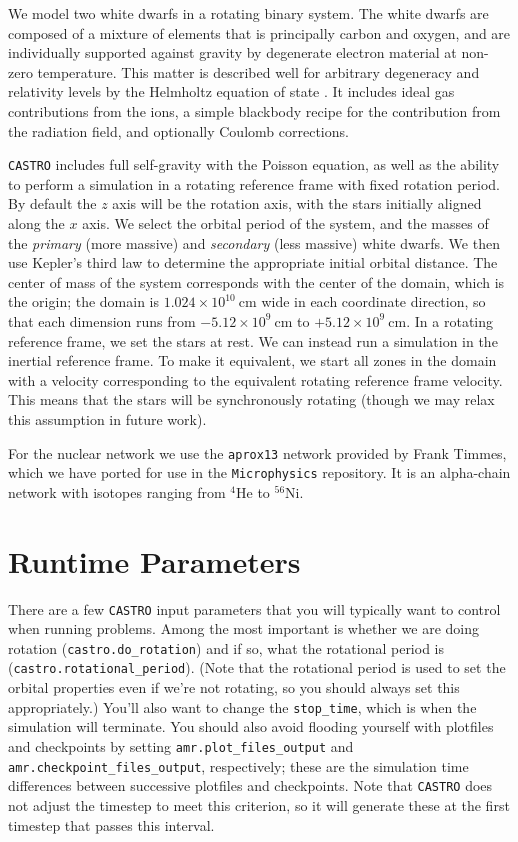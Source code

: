 \documentclass[12pt]{book}
\begin{document}
We model two white dwarfs in a rotating binary system. The white dwarfs are composed of 
a mixture of elements that is principally carbon and oxygen, and are individually supported 
against gravity by degenerate electron material at non-zero temperature. This matter is described well 
for arbitrary degeneracy and relativity levels by the Helmholtz equation of state \cite{timmes_swesty:2000}.
It includes ideal gas contributions from the ions, a simple blackbody recipe for the contribution from 
the radiation field, and optionally Coulomb corrections. 

\texttt{CASTRO} includes full self-gravity with the Poisson equation, as well as the ability to perform a
simulation in a rotating reference frame with fixed rotation period. By default the $z$ axis will 
be the rotation axis, with the stars initially aligned along the $x$ axis. We select the 
orbital period of the system, and the masses of the \textit{primary} (more massive) and 
\textit{secondary} (less massive) white dwarfs. We then use Kepler's third law to determine the 
appropriate initial orbital distance. The center of mass of the system corresponds with the center 
of the domain, which is the origin; the domain is $1.024 \times 10^{10}\ \text{cm}$ wide in each 
coordinate direction, so that each dimension runs from $-5.12 \times 10^{9}\ \text{cm}$ to 
$+5.12 \times 10^{9}\ \text{cm}$. In a rotating reference frame, we set the stars at rest. 
We can instead run a simulation in the inertial reference frame. To make it equivalent, we
start all zones in the domain with a velocity corresponding to the equivalent rotating 
reference frame velocity. This means that the stars will be synchronously rotating (though we
may relax this assumption in future work).

For the nuclear network we use the \texttt{aprox13} network provided by Frank Timmes, which 
we have ported for use in the \texttt{Microphysics} repository. It is an alpha-chain network 
with isotopes ranging from ${}^4$He to ${}^{56}$Ni.

\section{Runtime Parameters}

There are a few \texttt{CASTRO} input parameters that you will typically want to control when running problems. 
Among the most important is whether we are doing rotation (\texttt{castro.do\_rotation}) and if so, 
what the rotational period is (\texttt{castro.rotational\_period}). (Note that the rotational period 
is used to set the orbital properties even if we're not rotating, so you should always set this appropriately.)
You'll also want to change the \texttt{stop\_time}, which is when the simulation will terminate. 
You should also avoid flooding yourself with plotfiles and checkpoints by setting \texttt{amr.plot\_files\_output} and 
\texttt{amr.checkpoint\_files\_output}, respectively; these are the simulation time differences
between successive plotfiles and checkpoints. Note that \texttt{CASTRO} does not adjust the timestep 
to meet this criterion, so it will generate these at the first timestep that passes this interval.
\end{document}
